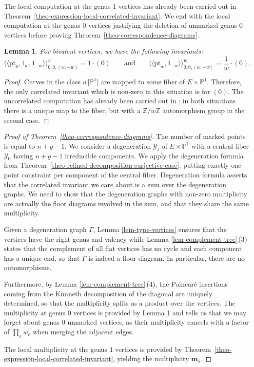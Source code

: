 \documentclass[pdftex]{sigma}
\newcommand{\pt}{\mathrm{pt}}
\newcommand{\PP}{\mathbb{P}}
\newcommand{\ZZ}{\mathbb{Z}}
\newcommand{\bfm}{ {\boldsymbol m} }
\newcommand{\Y}{\mathcal{Y}}
\numberwithin{equation}{section}
\newtheorem{lem}[theo]{Lemma}
\theoremstyle{definition}
\begin{document}
The local computation at the genus $1$ vertices has already been carried out in Theorem~\ref{theo-expression-local-correlated-invariant}. We end with the local computation at the genus $0$ vertices justifying the deletion of unmarked genus $0$ vertices before proving Theorem~\ref{theo-correspondence-diagrams}.

\begin{lem}\label{lem-local-computation-bivalent-vertex}
 For bivalent vertices, we have the following invariants:
 \[ \langle\langle\pt_0,1_w,1_{-w}\rangle\rangle^w_{0,0,(w,-w)} = 1\cdot (0)
 \qquad \text{and}\qquad
\langle\langle\pt_w,1_{-w}\rangle\rangle^w_{0,0,(w,-w)} = \frac{1}{w}\cdot (0). \]
\end{lem}

\begin{proof}
 Curves in the class $w\big[\PP^1\big]$ are mapped to some fiber of $E\times\PP^1$. Therefore, the only correlated invariant which is non-zero in this situation is for $(0)$. The uncorrelated computation has already been carried out in \cite[Lemma 3.3]{bousseau2021floor}: in both situations there is a unique map to the fiber, but with a $\ZZ/w\ZZ$ automorphism group in the second case.
\end{proof}

\begin{proof}[Proof of Theorem~\ref{theo-correspondence-diagrams}]
 The number of marked points is equal to $n+g-1$. We consider a degeneration $\Y_t$ of $E\times\PP^1$ with a central fiber $\Y_0$ having $n+g-1$ irreducible components. We apply the degeneration formula from Theorem~\ref{theo-refined-decomposition-surjective-case}, putting exactly one point constraint per component of the central fiber. Degeneration formula asserts that the correlated invariant we care about is a sum over the degeneration graphs. We need to show that the degeneration graphs with non-zero multiplicity are actually the floor diagrams involved in the sum, and that they share the same multiplicity.

 Given a degeneration graph $\Gamma$, Lemma \ref{lem-type-vertices} ensures that the vertices have the right genus and valency while Lemma \ref{lem-complement-tree}\,(3) states that the complement of all flat vertices has no cycle and each component has a unique end, so that $\Gamma$ is indeed a floor diagram. In particular, there are no automorphisms.

 Furthermore, by Lemma \ref{lem-complement-tree}\,(4), the Poincar\'e insertions coming from the K\"unneth decomposition of the diagonal are uniquely determined, so that the multiplicity splits as a product over the vertices. The multiplicity at genus $0$ vertices is provided by Lemma \ref{lem-local-computation-bivalent-vertex} and tells us that we may forget about genus $0$ unmarked vertices, as their multiplicity cancels with a factor of $\prod_e w_e$ when merging the adjacent edges.

 The local multiplicity at the genus $1$ vertices is provided by Theorem~\ref{theo-expression-local-correlated-invariant}, yielding the multiplicity $\bfm_\delta$.
\end{proof}
\end{document}
